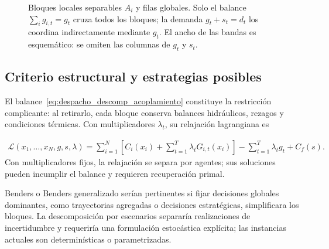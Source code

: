 \begin{figure}[htbp]
\centering
{}
\caption[Estructura por bloques de la matriz de restricciones]{Bloques locales separables $A_i$ y filas globales. Solo el balance $\sum_i g_{i,t}=g_t$ cruza todos los bloques; la demanda $g_t+s_t=d_t$ los coordina indirectamente mediante $g_t$. El ancho de las bandas es esquemático: se omiten las columnas de $g_t$ y $s_t$.}
\label{fig:dw_estructura_matriz}
\end{figure}

\subsection*{Criterio estructural y estrategias posibles}

El balance~\eqref{eq:despacho_descomp_acoplamiento} constituye la restricción complicante: al retirarlo, cada bloque conserva balances hidráulicos, rezagos y condiciones térmicas. Con multiplicadores $\lambda_t$, su relajación lagrangiana es

\begin{align}
    \mathcal{L}(x_1,\ldots,x_N,g,s,\lambda)
    =
    \sum_{i=1}^{N}
    \left[
        C_i(x_i)
        +
        \sum_{t=1}^{T}\lambda_t G_{i,t}(x_i)
    \right]
    -
    \sum_{t=1}^{T}\lambda_t g_t
    +
    C_f(s).
    \label{eq:lagrangiano_despacho}
\end{align}
Con multiplicadores fijos, la relajación se separa por agentes; sus soluciones pueden incumplir el balance y requieren recuperación primal.

Benders o Benders generalizado serían pertinentes si fijar decisiones globales dominantes, como trayectorias agregadas o decisiones estratégicas, simplificara los bloques. La descomposición por escenarios separaría realizaciones de incertidumbre y requeriría una formulación estocástica explícita; las instancias actuales son determinísticas o parametrizadas.


